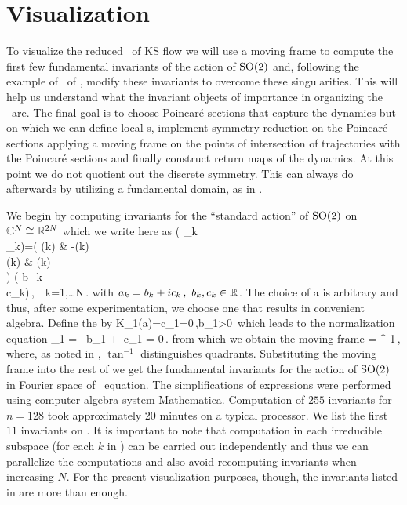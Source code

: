 \section{Visualization}
\label{sec:KSeMF}

To visualize the reduced \statesp\ of KS flow we will use a
moving frame to compute the first few fundamental invariants
of the action of $\mathrm{SO}(2)$ and, following the example of
\CLe\ of , modify these invariants to
overcome these singularities. This will help us understand
what the invariant objects of importance in organizing the
\statesp\ are. The final goal is to choose Poincar\'e
sections that capture the dynamics but on which we can define
local {\csection}s, implement symmetry reduction on the
Poincar\'e sections applying a moving frame on the points of
intersection of trajectories with the Poincar\'e sections and
finally construct return maps of the dynamics. At
this point we do not quotient out the discrete symmetry. This
can always do afterwards by utilizing a fundamental domain,
as in .


We begin by computing invariants for the ``standard action''
 of $\mathrm{SO}(2)$ on $\mathbb{C}^{N}\cong\mathbb{R}^{2N}$
which we write here as
\beq
	\left( _k \\ _k\earr \right)=\left(
			    			\cos(k\theta) & -\sin(k\theta)\\
						\sin(k\theta) & \cos(k\theta)\\
			   			\earr	
						\right) \left( b_k \\ c_k\earr\right)\,,\ \ k=1,\ldots N\,.
	\label{eq:SO2stand}
\eeq
with $a_k=b_k+i c_k\,,\ b_k,c_k\in\mathbb{R}^{}$.
The choice of a {\csection} is arbitrary and thus, after some
experimentation, we choose one that results in convenient
algebra.
Define the {\csection} by
\beq
 	K_1(a)=c_1=0\,,\qquad b_1>0\,
\eeq
which leads to the normalization equation
\beq
	_1 = \sin\theta\, b_1 +\cos\theta\, c_1 = 0\,.
	\label{eq:SO2norm}
\eeq
from which we obtain the moving frame
\beq
	\theta=-\tan^{-1}\,,
	\label{eq:SO2stand}
\eeq
where, as noted in , $\tan^{-1}$ distinguishes quadrants.
Substituting the moving frame into the rest of  we get the fundamental invariants for the action
of $\mathrm{SO}(2)$ in Fourier space of \KS\ equation. The simplifications of expressions were performed using computer algebra system Mathematica. Computation of $255$ invariants for $n=128$ took approximately $20$ minutes on a typical processor.
We list the first $11$ invariants on . It is important to note that computation in each irreducible
subspace (for each $k$ in ) can be carried out independently and thus we can parallelize the computations
and also avoid recomputing invariants when increasing $N$. For the present visualization purposes, though, the  invariants
listed in  are more than enough.


